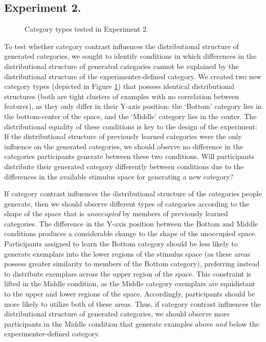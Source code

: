 \documentclass[12pt]{article}
\begin{document}
\begin{flushleft}
\section{Experiment 2.}

\begin{figure}
    \begin{center} 
    \caption{Category types tested in Experiment 2.}
    \label{fig:e2-conditions}
    \end{center}
\end{figure}

To test whether category contrast influences the distributional structure of
generated categories, we sought to identify conditions in which differences in
the distributional structure of generated categories cannot be explained by the
distributional structure of the experimenter-defined category. We created two
new category types (depicted in Figure \ref{fig:e2-conditions}) that possess
identical distributional structures (both are tight clusters of examples with no
correlation between features), as they only differ in their Y-axis position: the
`Bottom' category lies in the bottom-center of the space, and the `Middle'
category lies in the center. The distributional equality of these conditions is
key to the design of the experiment: If the distributional structure of
previously learned categories were the only influence on the generated
categories, we should observe no difference in the categories participants
generate between these two conditions. Will participants distribute their
generated category differently between conditions due to the differences in the
available stimulus space for generating a new category?

If category contrast influences the distributional structure of the categories
people generate, then we should observe different types of categories according
to the shape of the space that is {\em unoccupied} by members of previously
learned categories. The difference in the Y-axis position between the Bottom and
Middle conditions produces a considerable change to the shape of the unoccupied
space. Participants assigned to learn the Bottom category should be less likely
to generate exemplars into the lower regions of the stimulus space (as these
areas possess greater similarity to members of the Bottom category), preferring
instead to distribute exemplars across the upper region of the space. This
constraint is lifted in the Middle condition, as the Middle category exemplars
are equidistant to the upper and lower regions of the space. Accordingly,
participants should be more likely to utilize both of these areas. Thus, if
category contrast influences the distributional structure of generated
categories, we should observe more participants in the Middle condition that
generate examples above {\em and} below the experimenter-defined category.



\end{flushleft}
\end{document}
